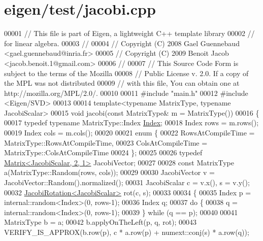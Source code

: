 \hypertarget{eigen_2test_2jacobi_8cpp_source}{}\section{eigen/test/jacobi.cpp}
\label{eigen_2test_2jacobi_8cpp_source}

\begin{DoxyCode}
00001 \textcolor{comment}{// This file is part of Eigen, a lightweight C++ template library}
00002 \textcolor{comment}{// for linear algebra.}
00003 \textcolor{comment}{//}
00004 \textcolor{comment}{// Copyright (C) 2008 Gael Guennebaud <gael.guennebaud@inria.fr>}
00005 \textcolor{comment}{// Copyright (C) 2009 Benoit Jacob <jacob.benoit.1@gmail.com>}
00006 \textcolor{comment}{//}
00007 \textcolor{comment}{// This Source Code Form is subject to the terms of the Mozilla}
00008 \textcolor{comment}{// Public License v. 2.0. If a copy of the MPL was not distributed}
00009 \textcolor{comment}{// with this file, You can obtain one at http://mozilla.org/MPL/2.0/.}
00010 
00011 \textcolor{preprocessor}{#include "main.h"}
00012 \textcolor{preprocessor}{#include <Eigen/SVD>}
00013 
00014 \textcolor{keyword}{template}<\textcolor{keyword}{typename} MatrixType, \textcolor{keyword}{typename} JacobiScalar>
00015 \textcolor{keywordtype}{void} jacobi(\textcolor{keyword}{const} MatrixType& m = MatrixType())
00016 \{
00017   \textcolor{keyword}{typedef} \textcolor{keyword}{typename} MatrixType::Index \hyperlink{namespace_eigen_a62e77e0933482dafde8fe197d9a2cfde}{Index};
00018   Index rows = m.rows();
00019   Index cols = m.cols();
00020 
00021   \textcolor{keyword}{enum} \{
00022     RowsAtCompileTime = MatrixType::RowsAtCompileTime,
00023     ColsAtCompileTime = MatrixType::ColsAtCompileTime
00024   \};
00025 
00026   \textcolor{keyword}{typedef} \hyperlink{group___core___module_class_eigen_1_1_matrix}{Matrix<JacobiScalar, 2, 1>} JacobiVector;
00027 
00028   \textcolor{keyword}{const} MatrixType a(MatrixType::Random(rows, cols));
00029 
00030   JacobiVector v = JacobiVector::Random().normalized();
00031   JacobiScalar c = v.x(), s = v.y();
00032   \hyperlink{group___jacobi___module_class_eigen_1_1_jacobi_rotation}{JacobiRotation<JacobiScalar>} rot(c, s);
00033 
00034   \{
00035     Index p = internal::random<Index>(0, rows-1);
00036     Index q;
00037     \textcolor{keywordflow}{do} \{
00038       q = internal::random<Index>(0, rows-1);
00039     \} \textcolor{keywordflow}{while} (q == p);
00040 
00041     MatrixType b = a;
00042     b.applyOnTheLeft(p, q, rot);
00043     VERIFY\_IS\_APPROX(b.row(p), c * a.row(p) + numext::conj(s) * a.row(q));

\end{DoxyCode}
